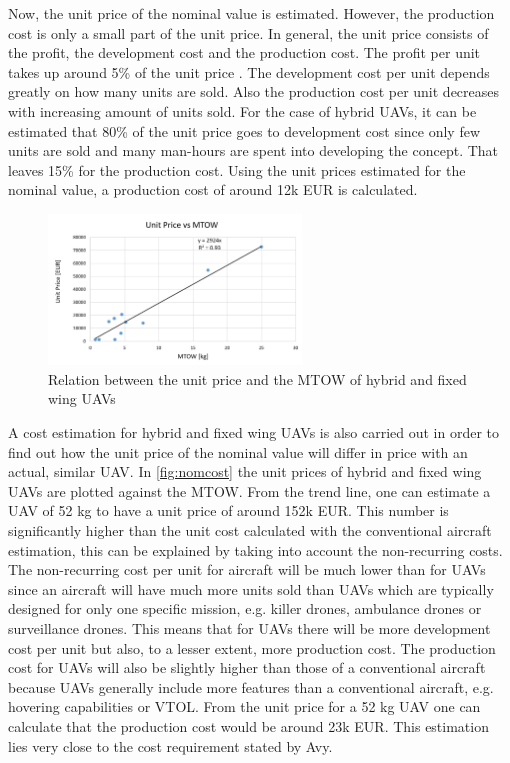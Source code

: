 Now, the unit price of the nominal value is estimated. However, the production cost is only a small part of the unit price. In general, the unit price consists of the profit, the development cost and the production cost. The profit per unit takes up around 5\% of the unit price \cite{costprofit}. The development cost per unit depends greatly on how many units are sold. Also the production cost per unit decreases with increasing amount of units sold. For the case of hybrid UAVs, it can be estimated that 80\% of the unit price goes to development cost since only few units are sold and many man-hours are spent into developing the concept. That leaves 15\% for the production cost. Using the unit prices estimated for the nominal value, a production cost of around 12k EUR is calculated.

\begin{figure}[H]
    \centering
    \includegraphics[width=0.6\textwidth]{CostAnalysis/Figures/CostEst}
    \caption{Relation between the unit price and the MTOW of hybrid and fixed wing UAVs}
    \label{fig:nomcost}
\end{figure}

A cost estimation for hybrid and fixed wing UAVs is also carried out in order to find out how the unit price of the nominal value will differ in price with an actual, similar UAV. In \autoref{fig:nomcost} the unit prices of hybrid and fixed wing UAVs are plotted against the MTOW. From the trend line, one can estimate a UAV of 52 kg to have a unit price of around 152k EUR. This number is significantly higher than the unit cost calculated with the conventional aircraft estimation, this can be explained by taking into account the non-recurring costs. The non-recurring cost per unit for aircraft will be much lower than  for UAVs since an aircraft will have much more units sold than UAVs which are typically designed for only one specific mission, e.g. killer drones, ambulance drones or surveillance drones. This means that for UAVs there will be more development cost per unit but also, to a lesser extent, more production cost. The production cost for UAVs will also be slightly higher than those of a conventional aircraft because UAVs generally include more features than a conventional aircraft, e.g. hovering capabilities or VTOL. From the unit price for a 52 kg UAV one can calculate that the production cost would be around 23k EUR. This estimation lies very close to the cost requirement stated by Avy.


